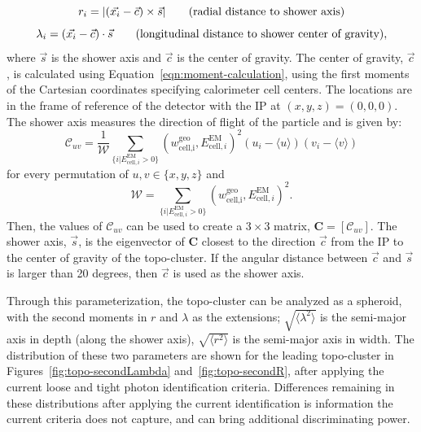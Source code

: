 \begin{equation}
    r_i = |(\vec{x_i} - \vec{c}) \times \vec{s}| \text{\hspace{2em}(radial distance to shower axis)} \\
\end{equation}
\begin{equation}
    \lambda_i = (\vec{x_i} - \vec{c}) \cdot \vec{s} \text{\hspace{2em}(longitudinal distance to shower center of gravity)},
\end{equation}
where $\vec{s}$ is the shower axis and $\vec{c}$ is the center of gravity. The center of gravity, $\vec{c}$, is calculated using Equation~\ref{eqn:moment-calculation}, using the first moments of the Cartesian coordinates specifying calorimeter cell centers. The locations are in the frame of reference of the detector with the \gls{IP} at $(x,y,z)= (0,0,0)$. The shower axis measures the direction of flight of the particle and is given by:
\begin{equation}
    \mathcal{C}_{uv} = \frac{1}{\mathcal{W}} \sum\limits_{\{i|E_{\text{cell},i}^{\text{EM}} >0\}}(w^{\text{geo}}_{\text{cell,i}}, E_{\text{cell},i}^{\text{EM}})^2 (u_i - \langle u \rangle)(v_i - \langle v \rangle)
\end{equation}
for every permutation of $u,v \in \{x,y,z\}$ and 
\begin{equation}
    \mathcal{W} = \sum\limits_{\{i|E_{\text{cell},i}^{\text{EM}} >0\}} (w^{\text{geo}}_{\text{cell,i}}, E_{\text{cell},i}^{\text{EM}})^2.
\end{equation}
Then, the values of $\mathcal{C}_{uv}$ can be used to create a $3 \times 3$ matrix, $\mathbf{C}=[\mathcal{C}_{uv}]$. The shower axis, $\vec{s}$, is the eigenvector of $\boldsymbol{C}$ closest to the direction $\vec{c}$ from the \gls{IP} to the center of gravity of the topo-cluster. If the angular distance between $\vec{c}$ and $\vec{s}$ is larger than 20 degrees, then $\vec{c}$ is used as the shower axis.

 Through this parameterization, the topo-cluster can be analyzed as a spheroid, with the second moments in $r$ and $\lambda$ as the extensions; $\sqrt{\langle \lambda^2 \rangle}$ is the semi-major axis in depth (along the shower axis), $\sqrt{\langle r^2 \rangle}$ is the semi-major axis in width. The distribution of these two parameters are shown for the leading topo-cluster in Figures~\ref{fig:topo-secondLambda} and~\ref{fig:topo-secondR}, after applying the current loose and tight photon identification criteria. Differences remaining in these distributions after applying the current identification is information the current criteria does not capture, and can bring additional discriminating power.

